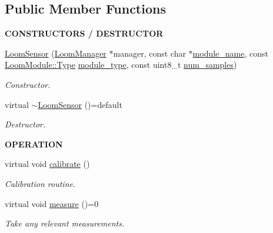 \subsection*{Public Member Functions}
\begin{Indent}{\bf C\+O\+N\+S\+T\+R\+U\+C\+T\+O\+RS / D\+E\+S\+T\+R\+U\+C\+T\+OR}\par
\begin{DoxyCompactItemize}
\item 
\hyperlink{class_loom_sensor_acce7ce989a74b5e4b3c8ee51ae55e8a9}{Loom\+Sensor} (\hyperlink{class_loom_manager}{Loom\+Manager} $\ast$manager, const char $\ast$\hyperlink{class_loom_module_adf6e68ad7e9fa2acfca7a8a280680764}{module\+\_\+name}, const \hyperlink{class_loom_module_aee91d0a75140d51ee428fc2d4417d865}{Loom\+Module\+::\+Type} \hyperlink{class_loom_module_a152d394f37236a2b159dae19da67eeb0}{module\+\_\+type}, const uint8\+\_\+t \hyperlink{class_loom_sensor_a0e74ebbaecde15ed1c71e1bb6bc6aebe}{num\+\_\+samples})
\begin{DoxyCompactList}\small\item\em Constructor. \end{DoxyCompactList}\item 
virtual \hyperlink{class_loom_sensor_aac0541421949a20b91a13583271f6757}{$\sim$\+Loom\+Sensor} ()=default
\begin{DoxyCompactList}\small\item\em Destructor. \end{DoxyCompactList}\end{DoxyCompactItemize}
\end{Indent}
\begin{Indent}{\bf O\+P\+E\+R\+A\+T\+I\+ON}\par
\begin{DoxyCompactItemize}
\item 
virtual void \hyperlink{class_loom_sensor_ab75183469715506e8a694b9559b76c35}{calibrate} ()
\begin{DoxyCompactList}\small\item\em Calibration routine. \end{DoxyCompactList}\item 
virtual void \hyperlink{class_loom_sensor_a390ef79a4d5d6b6386e099c7fe56ed1a}{measure} ()=0
\begin{DoxyCompactList}\small\item\em Take any relevant measurements. \end{DoxyCompactList}\end{DoxyCompactItemize}
\end{Indent}

